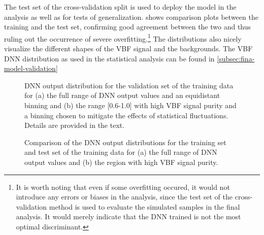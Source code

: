 The test set of the cross-validation split is used to deploy the model in the analysis as well as for tests of generalization.
 shows comparison plots between the training and the test set, confirming good agreement between the two and thus ruling out the occurrence of severe overfitting.\footnote{It is worth noting that even if some overfitting occured, it would not introduce any errors or biases in the analysis, since the test set of the cross-validation method is used to evaluate the simulated samples in the final analysis. It would merely indicate that the DNN trained is not the most optimal discriminant.}
The distributions also nicely visualize the different shapes of the VBF signal and the backgrounds.
The VBF DNN distribution as used in the statistical analysis can be found in \cref{subsec:fina-model-validation}
\captionsetup[subfloat]{captionskip=7pt} %
\begin{figure}[ht]
    \caption{DNN output distribution for the validation set of the training data for (a) the full range of DNN output values and an equidistant binning and (b) the range [0.6-1.0] with high VBF signal purity and a binning chosen to mitigate the effects of statistical fluctuations. Details are provided in the text.}
    \label{fig:dnn-val-set}
\end{figure}


\begin{figure}[t]
    \caption{Comparison of the DNN output distributions for the training set and test set of the training data for (a) the full range of DNN output values and (b) the region with high VBF signal purity.}
    \label{fig:dnn-train-vs-test}
\end{figure}


